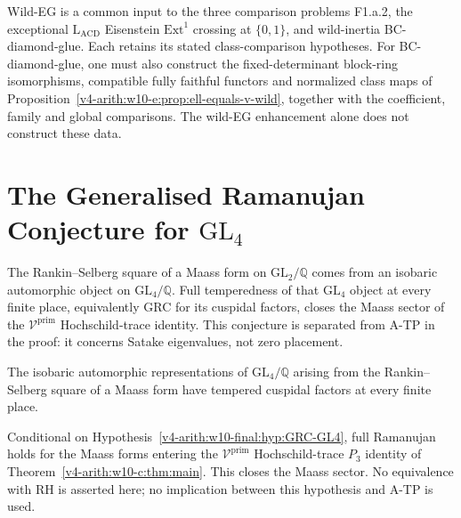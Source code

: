 \begin{remark}
\label{v4-arith:w10-final:rem:wild-eg}
Wild-EG is a common input to the three comparison problems
F1.a.2, the exceptional $\mathrm{L}_{\mathrm{ACD}}$ Eisenstein
$\mathrm{Ext}^1$ crossing at $\{0,1\}$, and wild-inertia
BC-diamond-glue. Each retains its stated class-comparison hypotheses.
For BC-diamond-glue, one must also construct the fixed-determinant
block-ring isomorphisms, compatible fully faithful functors and
normalized class maps of
Proposition~\ref{v4-arith:w10-e:prop:ell-equals-v-wild}, together with the
coefficient, family and global comparisons. The wild-EG enhancement
alone does not construct these data.
\end{remark}

\section{The Generalised Ramanujan Conjecture for
\texorpdfstring{\(\mathrm{GL}_{4}\)}{GL\_4}}
\label{v4-arith:w10-final:sub-rh}

The Rankin--Selberg square of a Maass form on \(\mathrm{GL}_{2}/\mathbb{Q}\)
comes from an isobaric automorphic object on
\(\mathrm{GL}_{4}/\mathbb{Q}\). Full temperedness of that
\(\mathrm{GL}_{4}\) object at every finite place, equivalently GRC for
its cuspidal factors, closes the Maass sector of the
\(\mathcal{V}^{\mathrm{prim}}\) Hochschild-trace identity. This
conjecture is separated from A-TP in the proof: it concerns Satake
eigenvalues, not zero placement.

\begin{hypothesis}
\label{v4-arith:w10-final:hyp:GRC-GL4}
\ClaimStatusConditional The isobaric automorphic representations of
\(\mathrm{GL}_{4}/\mathbb{Q}\) arising from the Rankin--Selberg square
of a Maass form have tempered cuspidal factors at every finite place.
\end{hypothesis}

\begin{proposition}
\label{v4-arith:w10-final:prop:GRC-GL4}
\ClaimStatusProvedHereConditional Conditional on
Hypothesis~\ref{v4-arith:w10-final:hyp:GRC-GL4}, full Ramanujan holds for the
Maass forms entering the \(\mathcal{V}^{\mathrm{prim}}\)
Hochschild-trace \(P_{3}\) identity of Theorem~\ref{v4-arith:w10-c:thm:main}.
This closes the Maass sector. No equivalence with RH is asserted here; no implication between this
hypothesis and A-TP is used.
\end{proposition}

